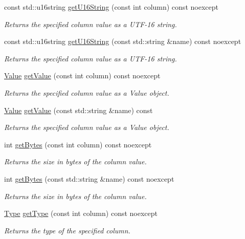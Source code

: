 \begin{DoxyCompactItemize}
const std\-::u16string \hyperlink{a00010_a2b48f9e2ffbcfe787d85b4372a7ee29d}{get\-U16\-String} (const int column) const noexcept
\begin{DoxyCompactList}\small\item\em Returns the specified column value as a U\-T\-F-\/16 string. \end{DoxyCompactList}\item 
const std\-::u16string \hyperlink{a00010_ad6024ad6e74ee1ac47ad0ce79f905026}{get\-U16\-String} (const std\-::string \&name) const noexcept
\begin{DoxyCompactList}\small\item\em Returns the specified column value as a U\-T\-F-\/16 string. \end{DoxyCompactList}\item 
\hyperlink{a00015}{Value} \hyperlink{a00010_a41fcbc5da6eb3fe6fc75e4faed208fc6}{get\-Value} (const int column) const noexcept
\begin{DoxyCompactList}\small\item\em Returns the specified column value as a Value object. \end{DoxyCompactList}\item 
\hyperlink{a00015}{Value} \hyperlink{a00010_ad352a7124ee46d756462c8a1b014599a}{get\-Value} (const std\-::string \&name) const
\begin{DoxyCompactList}\small\item\em Returns the specified column value as a Value object. \end{DoxyCompactList}\item 
int \hyperlink{a00010_aeb571e9157ef46c42ed48fc229b7842d}{get\-Bytes} (const int column) const noexcept
\begin{DoxyCompactList}\small\item\em Returns the size in bytes of the column value. \end{DoxyCompactList}\item 
int \hyperlink{a00010_ad183a562774f9590273bf35c6e232a1a}{get\-Bytes} (const std\-::string \&name) const noexcept
\begin{DoxyCompactList}\small\item\em Returns the size in bytes of the column value. \end{DoxyCompactList}\item 
\hyperlink{a00038_ad7a8ff5f375eca25eb6e3a51d746a04c}{Type} \hyperlink{a00010_a0450ea397b1a9d8dd636b82c8757d33e}{get\-Type} (const int column) const noexcept
\begin{DoxyCompactList}\small\item\em Returns the type of the specified column. \end{DoxyCompactList}\item 

\end{DoxyCompactItemize}
